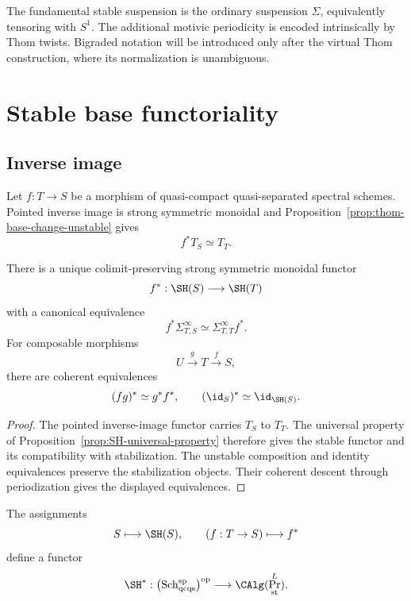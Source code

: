 \begin{remark}
\label{rem:intrinsic-suspension-notation}
The fundamental stable suspension is the ordinary suspension $\Sigma$, equivalently tensoring with
$S^1$.  The additional motivic periodicity is encoded intrinsically by Thom twists.  Bigraded
notation will be introduced only after the virtual Thom construction, where its normalization is
unambiguous.
\end{remark}

\section{Stable base functoriality}
\label{sec:stable-base-functoriality}

\subsection{Inverse image}

Let $f:T\to S$ be a morphism of quasi-compact quasi-separated spectral schemes.  Pointed inverse
image is strong symmetric monoidal and Proposition~\ref{prop:thom-base-change-unstable} gives
\[
    f^*T_S
    \simeq
    T_T.
\]

\begin{proposition}
\label{prop:stable-inverse-image}
There is a unique colimit-preserving strong symmetric monoidal functor
\[
    f^*:\SH(S)\longrightarrow\SH(T)
\]
with a canonical equivalence
\[
    f^*\Sigma_{T,S}^\infty
    \simeq
    \Sigma_{T,T}^\infty f^*.
\]
For composable morphisms
\[
    U\xrightarrow{g}T\xrightarrow{f}S,
\]
there are coherent equivalences
\[
    (fg)^*
    \simeq
    g^*f^*,
    \qquad
    (\id_S)^*
    \simeq
    \id_{\SH(S)}.
\]
\end{proposition}

\begin{proof}
The pointed inverse-image functor carries $T_S$ to $T_T$.  The universal property of
Proposition~\ref{prop:SH-universal-property} therefore gives the stable functor and its compatibility
with stabilization.  The unstable composition and identity equivalences preserve the stabilization
objects.  Their coherent descent through periodization gives the displayed equivalences.
\end{proof}

\begin{corollary}
\label{cor:SH-star-functor}
The assignments
\[
    S\longmapsto\SH(S),
    \qquad
    (f:T\to S)\longmapsto f^*
\]
define a functor
\[
    \SH^*:
    \bigl(\operatorname{Sch}^{\mathrm{sp}}_{\mathrm{qcqs}}\bigr)^{\mathrm{op}}
    \longrightarrow
    \CAlg(\Pr^L_{\mathrm{st}}).
\]
\end{corollary}


